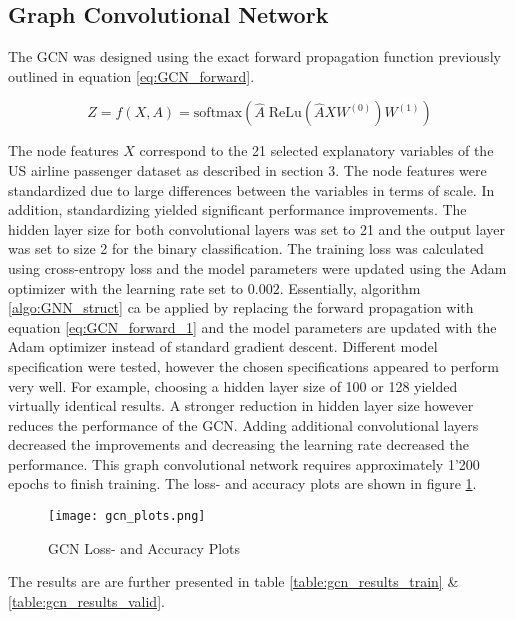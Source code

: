   \subsection{Graph Convolutional Network}

  The GCN was designed using the exact forward propagation function
  previously outlined in equation \ref{eq:GCN_forward}.

  \begin{equation}
	  Z = f(X,A) = \text{softmax}\left(\hat A \;\text{ReLu}\left(\hat A X
	  W^{(0)}\right)W^{(1)}\right)
      \label{eq:GCN_forward_1}
  \end{equation}

  \noindent The node features $X$ correspond to the 21 selected explanatory 
  variables of the US airline passenger dataset as described in section 3. The
  node features were standardized due to large differences between the
  variables in terms of scale. In addition, standardizing yielded significant
  performance improvements. The hidden layer size for both convolutional layers
  was set to 21 and the output layer was set to size 2 for the binary
  classification. The training loss was calculated using cross-entropy loss and 
  the model parameters were updated using the Adam optimizer
  \citep{kingma2014adam} with the learning rate set to $0.002$. Essentially,
  algorithm \ref{algo:GNN_struct} ca be applied by replacing the forward
  propagation with equation \ref{eq:GCN_forward_1} and the model parameters are
  updated with the Adam optimizer instead of standard gradient descent.
  Different model specification were tested, however the chosen specifications
  appeared to perform very well. For example, choosing a hidden layer size of
  100 or 128 yielded virtually identical results. A stronger reduction in
  hidden layer size however reduces the performance of the GCN. Adding additional
  convolutional layers decreased the improvements and decreasing the learning
  rate decreased the performance. This graph convolutional network requires
  approximately 1'200 epochs to finish training. The loss- and accuracy plots
  are shown in figure \ref{fig:gcn_plots}.

  \begin{figure}[h]
		\centering
		\texttt{[image: gcn\_plots.png]}
		\caption{GCN Loss- and Accuracy Plots}
        \label{fig:gcn_plots}
  \end{figure}

  \noindent The results are are further presented in table
  \ref{table:gcn_results_train} \& \ref{table:gcn_results_valid}. 

